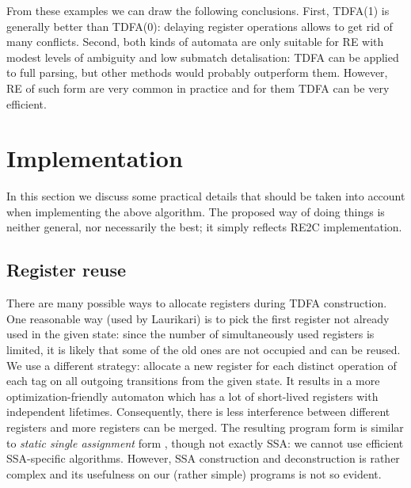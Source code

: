 \documentclass{article}
\theoremstyle{definition}
\begin{document}
\begin{multicols}{2}

From these examples we can draw the following conclusions.
First, TDFA(1) is generally better than TDFA(0): delaying register operations allows to get rid of many conflicts.
Second, both kinds of automata are only suitable for RE with modest levels of ambiguity
and low submatch detalisation: TDFA can be applied to full parsing, but other methods would probably outperform them.
However, RE of such form are very common in practice and for them TDFA can be very efficient.



\section{Implementation}\label{section_implementation}

In this section we discuss some practical details that should be taken into account when implementing the above algorithm.
The proposed way of doing things is neither general, nor necessarily the best;
it simply reflects RE2C implementation.

\subsection*{Register reuse}

There are many possible ways to allocate registers during TDFA construction.
One reasonable way (used by Laurikari) is to pick the first register not already used in the given state:
since the number of simultaneously used registers is limited,
it is likely that some of the old ones are not occupied and can be reused.
We use a different strategy: allocate a new register for each distinct operation of each tag on all outgoing transitions from the given state.
It results in a more optimization-friendly automaton
which has a lot of short-lived registers with independent lifetimes.
Consequently, there is less interference between different registers and more registers can be merged.
The resulting program form is similar to \emph{static single assignment} form \cite{SSA},
though not exactly SSA: we cannot use efficient SSA-specific algorithms.
However, SSA construction and deconstruction is rather complex and its usefulness on our (rather simple) programs is not so evident.
\\


\end{multicols}
\end{document}
